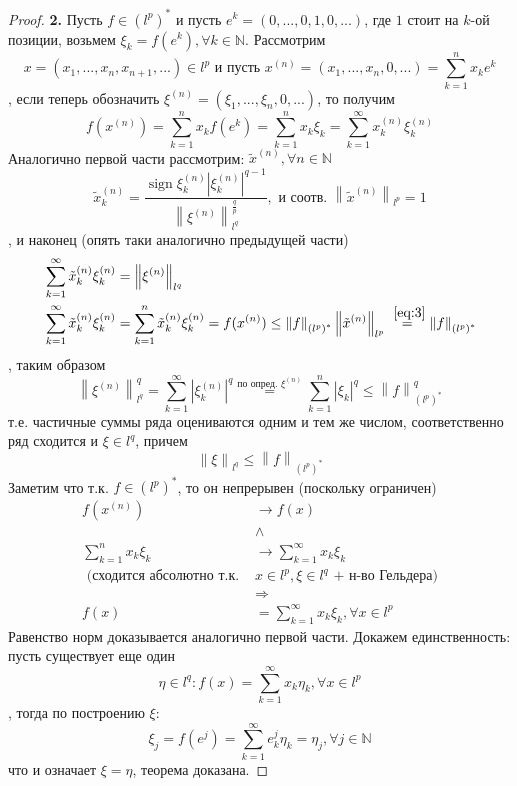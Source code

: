 \documentclass[12pt,a4paper]{article}
\theoremstyle{definition}
\newcommand{\Natural}{\mathbb{N}}
\newcommand{\norm}[1]{\left\lVert#1\right\rVert}
\DeclareMathOperator{\sign}{sign}
\newcommand{\conj}[1]{\left(#1\right)^*}
\begin{document}
\begin{proof}
	\textbf{2.} Пусть $f \in \conj{l^p}$ и пусть $e^k = (0, ..., 0, 1, 0, ...)$, где $1$ стоит на $k$-ой позиции, возьмем $\xi_k = f(e^k), \forall k \in \Natural$. Рассмотрим
	$$x = (x_1, ..., x_n, x_{n+1}, ...) \in l^p \text{ и пусть } x^{(n)} = (x_1, ..., x_n, 0, ...) = \sum_{k=1}^{n}{x_k e^k}$$
	, если теперь обозначить $\xi^{(n)} = (\xi_1, ..., \xi_n, 0, ...)$, то получим
	$$f(x^{(n)}) = \sum_{k=1}^{n}{x_k f(e^k)} = \sum_{k=1}^{n}{x_k \xi_k} = \sum_{k=1}^{\infty}{ x^{(n)}_k \xi^{(n)}_k }$$
	Аналогично первой части рассмотрим: $\tilde{x}^{(n)}, \forall n \in \Natural$
	\begin{equation}\label{eq:3}
		\tilde{x}_k^{(n)} = \frac{\sign{\xi_k^{(n)}} \left|\xi_k^{(n)}\right|^{q-1}}{\norm{\xi^{(n)}}_{l^q}^{\frac{q}{p}}}, \text{ и соотв. } \norm{\tilde{x}^{(n)}}_{l^p} = 1
	\end{equation}
	, и наконец (опять таки аналогично предыдущей части)
	\begin{align*}
		&\sum_{k=1}^{\infty}{ \tilde{x}^{(n)}_k \xi^{(n)}_k } = \norm{\xi^{(n)}}_{l^q} \\
		&\sum_{k=1}^{\infty}{ \tilde{x}^{(n)}_k \xi^{(n)}_k } = 
		\sum_{k=1}^{n}{ \tilde{x}^{(n)}_k \xi^{(n)}_k } = f(x^{(n)}) \leq 
		\norm{f}_{\conj{l^p}} \norm{\tilde{x}^{(n)}}_{l^p} \overset{~\eqref{eq:3}}{=} \norm{f}_{\conj{l^p}}
	\end{align*}
	, таким образом
	$$\norm{\xi^{(n)}}_{l^q}^q = \sum_{k=1}^{\infty}{|\xi_k^{(n)}|^q} \overset{\text{по опред. } \xi^{(n)}}{=} \sum_{k=1}^{n}{|\xi_k|^q} \leq \norm{f}_{\conj{l^p}}^q$$
	т.е. частичные суммы ряда оцениваются одним и тем же числом, соответственно ряд сходится и $\xi \in l^q$, причем 
	$$\norm{\xi}_{l^q} \leq \norm{f}_{\conj{l^p}}$$
	Заметим что т.к. $f \in \conj{l^p}$, то он непрерывен (поскольку ограничен)
	\begin{align*}
	f(x^{(n)}) &\to f(x) \\ &\wedge \\
	\sum_{k=1}^{n}{x_k \xi_k} &\to \sum_{k=1}^{\infty}{x_k \xi_k} \\ 
	\text{ (сходится абсолютно т.к. } &x \in l^p, \xi \in l^q \text{ + н-во Гельдера}) \\
	&\Rightarrow \\
	f(x) &= \sum_{k=1}^{\infty}{x_k \xi_k}, \forall x \in l^p
	\end{align*}
	Равенство норм доказывается аналогично первой части. Докажем единственность: пусть существует еще один
	$$\eta \in l^q: f(x) = \sum_{k=1}^{\infty}{x_k \eta_k}, \forall x \in l^p$$
	, тогда по построению $\xi$:
	$$\xi_j = f(e^j) = \sum_{k=1}^{\infty}{e^j_k \eta_k} = \eta_j, \forall j \in \Natural$$
	что и означает $\xi = \eta$, теорема доказана.
	
\end{proof}
\end{document}
